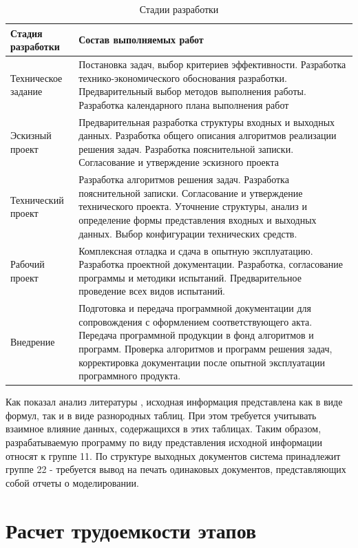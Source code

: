 \documentclass[14pt,oneside,final]{extreport}
\begin{document}
		\begin{table}[h!]
			\centering
			\caption{Стадии разработки}\label{tab:economy} 
			\begin{tabularx}{\textwidth}{|l|X|}
				
				\hline Стадия разработки & \multicolumn{1}{Z|}{Состав выполняемых работ }\\ 
				\hline Техническое задание & Постановка задач, выбор критериев эффективности. Разработка технико-экономического обоснования разработки. Предварительный выбор методов выполнения работы. Разработка календарного плана выполнения работ   \\ 
				\hline Эскизный проект & Предварительная разработка структуры входных и выходных данных. Разработка общего описания алгоритмов реализации решения задач. Разработка пояснительной записки. Согласование и утверждение эскизного проекта \\ 
				\hline Технический проект & Разработка алгоритмов решения задач. Разработка пояснительной записки. Согласование и утверждение технического проекта. Уточнение структуры, анализ и определение формы представления входных и выходных данных. Выбор конфигурации технических средств.  \\ 			
				\hline Рабочий проект & Комплексная отладка и сдача в опытную эксплуатацию. Разработка проектной документации. Разработка, согласование программы и методики испытаний. Предварительное проведение всех видов  испытаний.   \\ 			
				\hline Внедрение & Подготовка и передача программной документации для сопровождения с оформлением соответствующего акта. Передача программной продукции в фонд алгоритмов и программ. Проверка алгоритмов и программ решения задач, корректировка документации после опытной эксплуатации программного продукта. \\ 
				\hline 
			\end{tabularx}
		\end{table}
		
		
	Как показал анализ литературы \cite{book:Kosilova}, исходная информация представлена как в виде формул, так и в виде разнородных таблиц. При этом требуется учитывать взаимное влияние данных, содержащихся в этих таблицах. Таким образом, разрабатываемую программу по виду представления исходной информации относят к группе 11. По структуре выходных документов система принадлежит группе 22 - требуется вывод на печать одинаковых документов, представляющих собой отчеты о моделировании.
	
	\section{Расчет трудоемкости этапов} 
\end{document}

